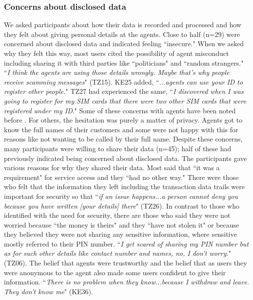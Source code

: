  \subsubsection{Concerns about disclosed data}We asked participants about how their data is recorded and processed and how they felt about giving personal details at the agents. Close to half (n=29) were concerned about disclosed data and indicated feeling ``insecure." 
 When we asked why they felt this way, most users cited the possibility of agent misconduct including sharing it with third parties like ``politicians" and ``random strangers." ``\textit{I think the agents are using those details wrongly. Maybe that’s why people receive scamming messages}" (TZ15). KE25 added,  ``\textit{...agents can use your ID to register other people.}" TZ27 had experienced the same, ``\textit{I discovered when I was going to register for my SIM cards that there were two other SIM cards that were registered under my ID}." Some of these concerns with agents have been noted before \cite{martin2019mobile}.
For others, the hesitation was purely a matter of privacy. Agents got to know the full names of their customers and some were not happy with this for reasons like not wanting to be called by their full name. 
 Despite these concerns, many participants were willing to share their data (n=45); half of these had previously indicated being concerned about disclosed data. The participants gave various reasons for why they shared their data. Most said that ``it was a requirement" for service access and they ``had no other way." There were those who felt that the information they left including the transaction data trails were important for security so that ``\textit{if an issue happens...a person cannot deny you because you have written [your details] there}" (TZ26).
In contrast to those who identified with the need for security, there are those who said they were not worried because ``the money is theirs" and they ``have not stolen it" or because they believed they were not sharing any sensitive information, where sensitive mostly referred to their PIN number. ``\textit{I get scared of sharing my PIN number but as for such other details like contact number and names, no, I don’t worry.}" (TZ06). The belief that agents were trustworthy and the belief that as users they were anonymous to the agent also made some users confident to give their information. 
``\textit{There is no problem when they know...because I withdraw and leave. They don’t know me}" (KE36).

